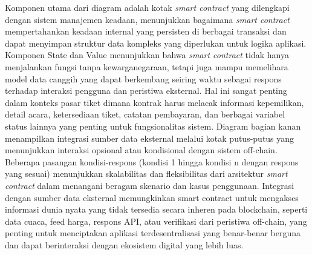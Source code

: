 Komponen utama dari diagram adalah kotak \emph{smart contract} yang dilengkapi
dengan sistem manajemen keadaan, menunjukkan bagaimana \emph{smart contract}
mempertahankan keadaan internal yang persisten di berbagai transaksi dan dapat
menyimpan struktur data kompleks yang diperlukan untuk logika aplikasi.
Komponen State dan Value menunjukkan bahwa \emph{smart contract} tidak hanya
menjalankan fungsi tanpa kewarganegaraan, tetapi juga mampu memelihara model
data canggih yang dapat berkembang seiring waktu sebagai respons terhadap
interaksi pengguna dan peristiwa eksternal. Hal ini sangat penting dalam
konteks pasar tiket dimana kontrak harus melacak informasi kepemilikan, detail
acara, ketersediaan tiket, catatan pembayaran, dan berbagai variabel status
lainnya yang penting untuk fungsionalitas sistem. Diagram bagian kanan
menampilkan integrasi sumber data eksternal melalui kotak putus-putus yang
menunjukkan interaksi opsional atau kondisional dengan sistem off-chain.
Beberapa pasangan kondisi-respons (kondisi 1 hingga kondisi n dengan respons
yang sesuai) menunjukkan skalabilitas dan fleksibilitas dari arsitektur
\emph{smart contract} dalam menangani beragam skenario dan kasus penggunaan.
Integrasi dengan sumber data eksternal memungkinkan smart contract untuk
mengakses informasi dunia nyata yang tidak tersedia secara inheren pada
blockchain, seperti data cuaca, feed harga, respons API, atau verifikasi dari
peristiwa off-chain, yang penting untuk menciptakan aplikasi terdesentralisasi
yang benar-benar berguna dan dapat berinteraksi dengan ekosistem digital yang
lebih luas.

